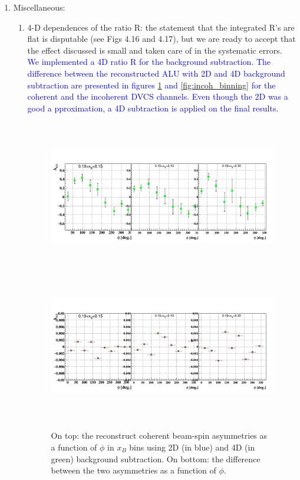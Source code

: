 \begin{enumerate}
Figs 1-4 of \url{https://clasweb.jlab.org/rungroups/lowq/wiki/images/a/a3/Final_1st_round_comments.pdf} 
Tighter $edist$ cut [-2,+3 mm].
Otherwise, even if you do not show it in the CAN, mention in one line that a 
specific study was done.
\item Miscellaneous:
   \begin{enumerate}
      \item 4-D dependences of the ratio R: the statement that the integrated R's 
    are flat is disputable (see Figs 4.16 and 4.17), but we are ready to accept 
    that the effect discussed is small and taken care of in the systematic 
    errors.\\
    \textcolor{blue}{We implemented a 4D ratio R for the background 
       subtraction. The difference between the reconstructed ALU with 2D and 4D 
       background subtraction are presented in figures \ref{fig:coh_binning} 
       and \ref{fig:incoh_binning} for the coherent and the incoherent DVCS 
       channels. Even though the 2D was a good a pproximation, a 4D subtraction 
    is applied on the final results.} 
    \begin{figure}[tbp]
    \includegraphics[height=6.6cm]{fig/BSA_Coherent_xB.png}
    \includegraphics[height=6.6cm]{fig/diff_BSA_Coherent_xB.png}
    \caption{On top: the reconstruct coherent beam-spin asymmetries as a 
    function of $\phi$ in $x_{B}$ bins using 2D (in blue) and 4D (in green) 
 background subtraction.  On bottom: the difference between the two asymmetries 
 as a function of $\phi$.}
    \label{fig:coh_binning}
    \end{figure}            


\end{enumerate}
\end{enumerate}

